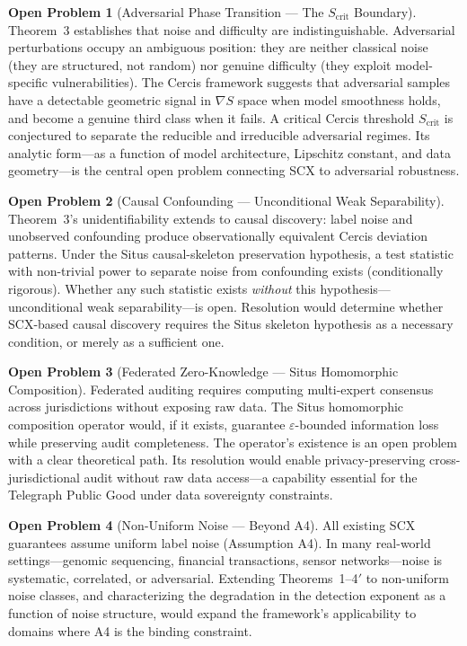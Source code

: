 \documentclass[twocolumn]{article}
\theoremstyle{definition}
\newtheorem{openproblem}{Open Problem}
\begin{document}
\begin{openproblem}[Adversarial Phase Transition — The $S_{\text{crit}}$ Boundary]
\label{prob:adversarial}
Theorem~3 establishes that noise and difficulty are indistinguishable. Adversarial perturbations occupy an ambiguous position: they are neither classical noise (they are structured, not random) nor genuine difficulty (they exploit model-specific vulnerabilities). The Cercis framework suggests that adversarial samples have a detectable geometric signal in $\nabla S$ space when model smoothness holds, and become a genuine third class when it fails. A critical Cercis threshold $S_{\text{crit}}$ is conjectured to separate the reducible and irreducible adversarial regimes. Its analytic form---as a function of model architecture, Lipschitz constant, and data geometry---is the central open problem connecting SCX to adversarial robustness.
\end{openproblem}

\begin{openproblem}[Causal Confounding — Unconditional Weak Separability]
\label{prob:causal}
Theorem~3's unidentifiability extends to causal discovery: label noise and unobserved confounding produce observationally equivalent Cercis deviation patterns. Under the Situs causal-skeleton preservation hypothesis, a test statistic with non-trivial power to separate noise from confounding exists (conditionally rigorous). Whether any such statistic exists \emph{without} this hypothesis---unconditional weak separability---is open. Resolution would determine whether SCX-based causal discovery requires the Situs skeleton hypothesis as a necessary condition, or merely as a sufficient one.
\end{openproblem}

\begin{openproblem}[Federated Zero-Knowledge — Situs Homomorphic Composition]
\label{prob:federated}
Federated auditing requires computing multi-expert consensus across jurisdictions without exposing raw data. The Situs homomorphic composition operator would, if it exists, guarantee $\varepsilon$-bounded information loss while preserving audit completeness. The operator's existence is an open problem with a clear theoretical path. Its resolution would enable privacy-preserving cross-jurisdictional audit without raw data access---a capability essential for the Telegraph Public Good under data sovereignty constraints.
\end{openproblem}

\begin{openproblem}[Non-Uniform Noise — Beyond A4]
\label{prob:nonuniform}
All existing SCX guarantees assume uniform label noise (Assumption A4). In many real-world settings---genomic sequencing, financial transactions, sensor networks---noise is systematic, correlated, or adversarial. Extending Theorems~1--4$'$ to non-uniform noise classes, and characterizing the degradation in the detection exponent as a function of noise structure, would expand the framework's applicability to domains where A4 is the binding constraint.
\end{openproblem}
\end{document}
